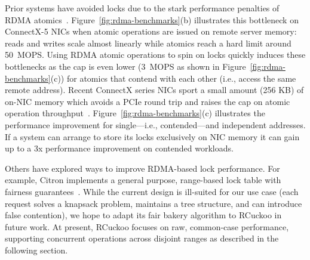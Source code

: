 
Prior systems have avoided locks due to the stark performance penalties of RDMA
atomics~\cite{design-guidelines}.  Figure~\ref{fig:rdma-benchmarks}(b)
illustrates this bottleneck on ConnectX-5 NICs when atomic operations are issued
on remote server memory: reads and writes scale almost linearly while atomics
reach a hard limit around 50~MOPS.  Using RDMA atomic operations to spin on
locks quickly induces these bottlenecks as the cap is even lower (3~MOPS as
shown in Figure~\ref{fig:rdma-benchmarks}(c)) for atomics that contend with each
other (i.e., access the same remote address).  Recent ConnectX series NICs sport
a small amount (256 KB) of on-NIC memory which avoids a PCIe round trip and
raises the cap on atomic operation
throughput~\cite{device-memory,sherman}. Figure~\ref{fig:rdma-benchmarks}(c)
illustrates the performance improvement for
single---i.e., contended---and independent addresses. If a system can arrange to
store its locks exclusively on NIC memory it can gain up to a 3x performance
improvement on contended workloads.

Others have explored ways to improve RDMA-based lock performance.  For
example, Citron implements a general purpose, range-based lock table
with fairness guarantees~\cite{citron}.  While the current design is
ill-suited for our use case (each request solves a knapsack problem,
maintains a tree structure, and can introduce false contention), we hope
to adapt its fair bakery algorithm to RCuckoo in future work.  At
present, RCuckoo focuses on raw, common-case performance, supporting
concurrent operations across disjoint ranges as described in the
following section.





